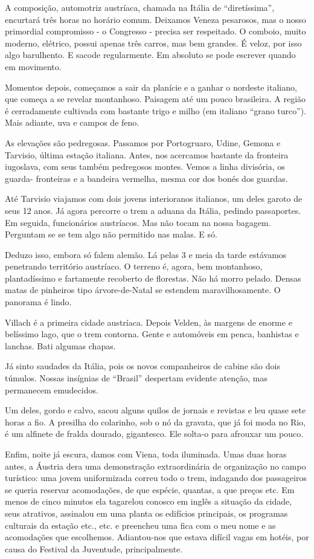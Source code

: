 A composição, automotriz austríaca, chamada na Itália de “diretíssima”, encurtará três horas no horário comum. Deixamos Veneza pesarosos, mas o nosso primordial compromisso - o Congresso - precisa ser respeitado. O comboio, muito moderno, elétrico, possui apenas três carros, mas bem grandes. É veloz, por isso algo barulhento. E sacode regularmente. Em absoluto se pode escrever quando em movimento.

Momentos depois, começamos a sair da planície e a ganhar o nordeste italiano, que começa a se revelar montanhoso. Paisagem até um pouco brasileira. A região é cerradamente cultivada com bastante trigo e milho (em italiano “grano turco”). Mais adiante, uva e campos de feno.

As elevações são pedregosas. Passamos por Portogruaro, Udine, Gemona e Tarvisio, última estação italiana. Antes, nos acercamos bastante da fronteira iugoslava, com seus também pedregosos montes. Vemos a linha divisória, os guarda- fronteiras e a bandeira vermelha, mesma cor dos bonés dos guardas.

Até Tarvisio viajamos com dois jovens interioranos italianos, um deles garoto de seus 12 anos. Já agora percorre o trem a aduana da Itália, pedindo passaportes. Em seguida, funcionários austríacos. Mas não tocam na nossa bagagem. Perguntam se se tem algo não permitido nas malas. E só.

Deduzo isso, embora só falem alemão. Lá pelas 3 e meia da tarde estávamos penetrando território austríaco. O terreno é, agora, bem montanhoso, plantadíssimo e fartamente recoberto de florestas. Não há morro pelado. Densas matas de pinheiros tipo árvore-de-Natal se estendem maravilhosamente. O panorama é lindo.

Villach é a primeira cidade austríaca. Depois Velden, às margens de enorme e belíssimo lago, que o trem contorna. Gente e automóveis em penca, banhistas e lanchas. Bati algumas chapas.

Já sinto saudades da Itália, pois os novos companheiros de cabine são dois túmulos. Nossas insígnias de “Brasil” despertam evidente atenção, mas permanecem emudecidos.

Um deles, gordo e calvo, sacou alguns quilos de jornais e revistas e leu quase sete horas a fio. A presilha do colarinho, sob o nó da gravata, que já foi moda no Rio, é um alfinete de fralda dourado, gigantesco. Ele solta-o para afrouxar um pouco.

Enfim, noite já escura, damos com Viena, toda iluminada. Umas duas horas antes, a Áustria dera uma demonstração extraordinária de organização no campo turístico: uma jovem uniformizada correu todo o trem, indagando dos passageiros se queria reservar acomodações, de que espécie, quantas, a que preços etc. Em menos de cinco minutos ela tagarelou conosco em inglês a situação da cidade, seus atrativos, assinalou em uma planta os edifícios principais, os programas culturais da estação etc., etc. e preencheu uma fica com o meu nome e as acomodações que escolhemos. Adiantou-nos que estava difícil vagas em hotéis, por causa do Festival da Juventude, principalmente.

